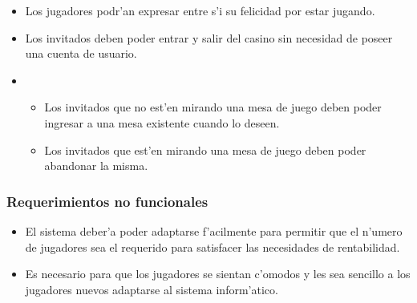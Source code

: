 \begin{itemize}

\item {} 

    Los jugadores podr'an expresar entre s'i su felicidad por estar jugando.

\item {} 

    Los invitados deben poder entrar y salir del casino sin necesidad de poseer una cuenta de usuario.

\item {}

    \begin{itemize}
        \item Los invitados que no est'en mirando una mesa de juego deben poder ingresar a una mesa existente cuando lo deseen.
        \item Los invitados que est'en mirando una mesa de juego deben poder abandonar la misma.
    \end{itemize}

\end{itemize}


\subsubsection{Requerimientos no funcionales}

\begin{itemize}

\item {}

    El sistema deber'a poder adaptarse f'acilmente para permitir que el n'umero de jugadores sea el requerido para satisfacer las necesidades de rentabilidad.

\item {}

    Es necesario para que los jugadores se sientan c'omodos y les sea sencillo a los jugadores nuevos adaptarse al sistema inform'atico.

\end{itemize}


